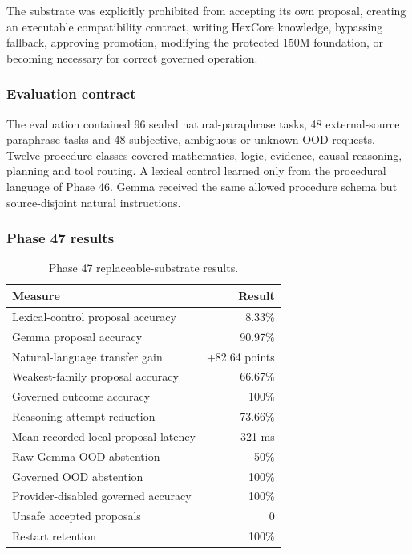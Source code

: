 The substrate was explicitly prohibited from accepting its own proposal,
creating an executable compatibility contract, writing HexCore knowledge,
bypassing fallback, approving promotion, modifying the protected 150M
foundation, or becoming necessary for correct governed operation.

\subsubsection{Evaluation contract}

The evaluation contained 96 sealed natural-paraphrase tasks, 48
external-source paraphrase tasks and 48 subjective, ambiguous or unknown OOD
requests.  Twelve procedure classes covered mathematics, logic, evidence,
causal reasoning, planning and tool routing.  A lexical control learned only
from the procedural language of Phase 46.  Gemma received the same allowed
procedure schema but source-disjoint natural instructions.

\subsubsection{Phase 47 results}

\begin{table}[htbp]
\centering
\begin{tabular}{lr}
\hline
\textbf{Measure} & \textbf{Result}\\
\hline
Lexical-control proposal accuracy & 8.33\%\\
Gemma proposal accuracy & 90.97\%\\
Natural-language transfer gain & +82.64 points\\
Weakest-family proposal accuracy & 66.67\%\\
Governed outcome accuracy & 100\%\\
Reasoning-attempt reduction & 73.66\%\\
Mean recorded local proposal latency & 321 ms\\
Raw Gemma OOD abstention & 50\%\\
Governed OOD abstention & 100\%\\
Provider-disabled governed accuracy & 100\%\\
Unsafe accepted proposals & 0\\
Restart retention & 100\%\\
\hline
\end{tabular}
\caption{Phase 47 replaceable-substrate results.}
\label{tab:phase47-results}
\end{table}

